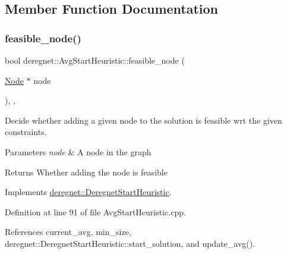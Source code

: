 \subsection{Member Function Documentation}
\mbox{\label{classderegnet_1_1AvgStartHeuristic_a3e18528bc735d47edcd719a72baf4e46}} 
\subsubsection{\texorpdfstring{feasible\+\_\+node()}{feasible\_node()}}
{\footnotesize\ttfamily bool deregnet\+::\+Avg\+Start\+Heuristic\+::feasible\+\_\+node (\begin{DoxyParamCaption}\item[{\hyperlink{namespacederegnet_a744bad34f2de9856d36715a445f027f3}{Node} $\ast$}]{node }\end{DoxyParamCaption})\hspace{0.3cm}{\ttfamily [override]}, {\ttfamily [private]}, {\ttfamily [virtual]}}



Decide whether adding a given node to the solution is feasible wrt the given constraints. 


\begin{DoxyParams}{Parameters}
{\em node} & A node in the graph\\
\hline
\end{DoxyParams}
\begin{DoxyReturn}{Returns}
Whether adding the node is feasible 
\end{DoxyReturn}


Implements \hyperlink{classderegnet_1_1DeregnetStartHeuristic_ac296c4f122f7d3ad2fcc2cbb0d1b5379}{deregnet\+::\+Deregnet\+Start\+Heuristic}.



Definition at line 91 of file Avg\+Start\+Heuristic.\+cpp.



References current\+\_\+avg, min\+\_\+size, deregnet\+::\+Deregnet\+Start\+Heuristic\+::start\+\_\+solution, and update\+\_\+avg().


